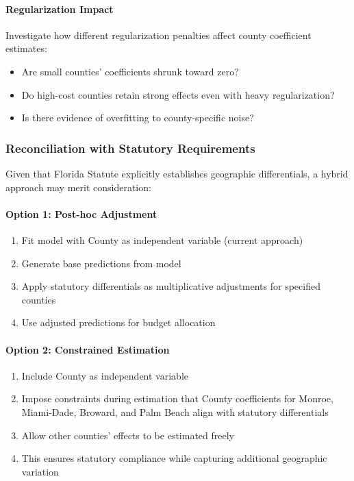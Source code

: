 \paragraph{Regularization Impact}
Investigate how different regularization penalties affect county coefficient estimates:
\begin{itemize}
    \item Are small counties' coefficients shrunk toward zero?
    \item Do high-cost counties retain strong effects even with heavy regularization?
    \item Is there evidence of overfitting to county-specific noise?
\end{itemize}

\subsubsection{Reconciliation with Statutory Requirements}

Given that Florida Statute explicitly establishes geographic differentials, a hybrid approach may merit consideration:

\paragraph{Option 1: Post-hoc Adjustment}
\begin{enumerate}
    \item Fit model with County as independent variable (current approach)
    \item Generate base predictions from model
    \item Apply statutory differentials as multiplicative adjustments for specified counties
    \item Use adjusted predictions for budget allocation
\end{enumerate}

\paragraph{Option 2: Constrained Estimation}
\begin{enumerate}
    \item Include County as independent variable
    \item Impose constraints during estimation that County coefficients for Monroe, Miami-Dade, Broward, and Palm Beach align with statutory differentials
    \item Allow other counties' effects to be estimated freely
    \item This ensures statutory compliance while capturing additional geographic variation
\end{enumerate}


